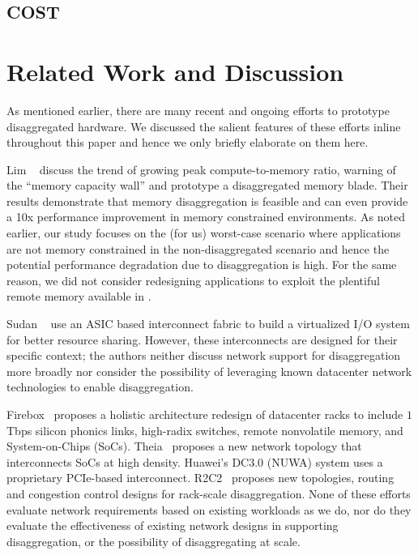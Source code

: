 \subsection{COST}






\vspace{-0.1in}
\section{Related Work and Discussion}
\label{sec:discussion}
\vspace{-0.05in}

As mentioned earlier, there are many recent and ongoing efforts to prototype disaggregated hardware. We discussed the salient features of these efforts inline throughout this paper and hence we only briefly elaborate on them here. 

Lim \etal~\cite{ddcHwDesign1, ddcHwDesign2} discuss the trend of growing peak compute-to-memory ratio, warning of the ``memory capacity wall'' and prototype a disaggregated memory blade. Their results demonstrate that memory disaggregation is feasible and can even provide a 10x performance improvement in memory constrained environments. As noted earlier, our study focuses on the (for us) worst-case scenario where applications are not memory constrained in the non-disaggregated scenario and hence the potential performance degradation due to disaggregation is high. For the same reason, we did not consider redesigning applications to exploit the plentiful remote memory available in \dis {}.

Sudan \etal~\cite{ddcHwDesign3} use an ASIC based interconnect fabric to build a virtualized I/O system for better resource sharing. However, these interconnects are designed for their specific context; the authors neither discuss network support for disaggregation more broadly nor consider the possibility of leveraging known datacenter network technologies to enable disaggregation.

Firebox~\cite{firebox} proposes a holistic architecture redesign of datacenter racks to include $1$Tbps silicon phonics links, high-radix switches, remote nonvolatile memory, and System-on-Chips (SoCs). Theia~\cite{theia} proposes a new network topology that interconnects SoCs at high density. Huawei's DC3.0 (NUWA) system uses a proprietary PCIe-based interconnect. R2C2~\cite{r2c2} proposes new topologies, routing and congestion control designs for rack-scale disaggregation.
None of these efforts evaluate network requirements based on existing workloads as we do, nor do they evaluate the effectiveness of existing network designs in supporting disaggregation, or the possibility of disaggregating at scale.

